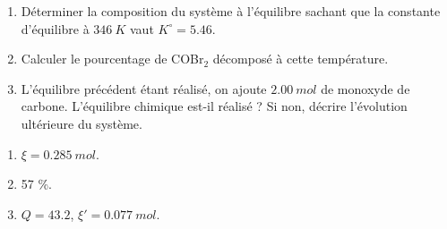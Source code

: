 \begin{enumerate}
	\item Déterminer la composition du système à l'équilibre sachant que la constante d'équilibre à $\SI{346}{K}$ vaut $K^\circ = 5.46$.
	\item Calculer le pourcentage de COBr$_2$ décomposé à cette température.
	\item L'équilibre précédent étant réalisé, on ajoute $\SI{2.00}{mol}$ de monoxyde de carbone. L'équilibre chimique est-il réalisé ? Si non, décrire l'évolution ultérieure du système.
\end{enumerate}

\begin{enumerate}
	\item $\xi = \SI{0.285}{mol}$.
	\item 57 \%.
	\item $Q = 43.2$, $\xi' = \SI{0.077}{mol}$.
\end{enumerate}